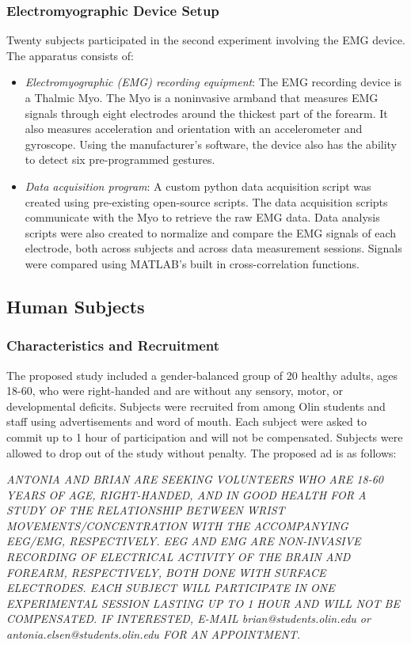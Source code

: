 \documentclass[journal]{IEEEtran}
\begin{document}
\subsubsection{Electromyographic Device Setup}
Twenty subjects participated in the second experiment involving the EMG device.
The apparatus consists of: 
\begin{itemize}
    \item \textit{Electromyographic (EMG) recording equipment}: The EMG recording device is a Thalmic Myo. The Myo is a noninvasive armband that measures EMG signals through eight electrodes around the thickest part of the forearm. It also measures acceleration and orientation with an accelerometer and gyroscope. Using the manufacturer's software, the device also has the ability to detect six pre-programmed gestures.
    \item \textit{Data acquisition program}: A custom python data acquisition script was created using pre-existing open-source scripts. The data acquisition scripts communicate with the Myo to retrieve the raw EMG data. Data analysis scripts were also created to normalize and compare the EMG signals of each electrode, both across subjects and across data measurement sessions. Signals were compared using MATLAB's built in cross-correlation functions.
\end{itemize}
   
\subsection{Human Subjects}
\subsubsection{Characteristics and Recruitment}
The proposed study included a gender-balanced group of 20 healthy adults, ages 18-60, who were right-handed and are without any sensory, motor, or developmental deficits. Subjects were recruited from among Olin students and staff using advertisements and word of mouth. Each subject were asked to commit up to 1 hour of participation and will not be compensated. Subjects were allowed to drop out of the study without penalty.
The proposed ad is as follows: \par

\vspace{5mm}

\scriptsize 
\textit{ANTONIA AND BRIAN ARE SEEKING VOLUNTEERS WHO ARE 18-60 YEARS OF AGE, RIGHT-HANDED, AND IN GOOD HEALTH FOR A STUDY OF THE RELATIONSHIP BETWEEN WRIST MOVEMENTS/CONCENTRATION WITH THE ACCOMPANYING EEG/EMG, RESPECTIVELY. EEG AND EMG ARE NON-INVASIVE RECORDING OF ELECTRICAL ACTIVITY OF THE BRAIN AND FOREARM, RESPECTIVELY, BOTH DONE WITH SURFACE ELECTRODES. EACH SUBJECT WILL PARTICIPATE IN ONE EXPERIMENTAL SESSION LASTING UP TO 1 HOUR AND WILL NOT BE COMPENSATED. IF INTERESTED, E-MAIL brian@students.olin.edu or antonia.elsen@students.olin.edu FOR AN APPOINTMENT.} 
\end{document}
